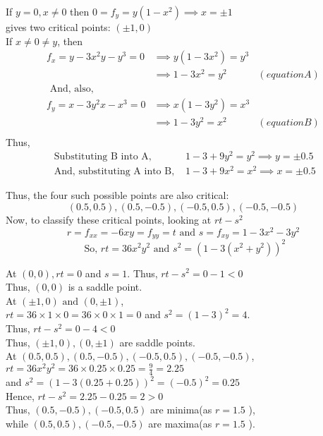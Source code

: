 \documentclass[20pt,a4paper]{extarticle} %
\theoremstyle{definition}
\theoremstyle{definition}
\begin{document}
If $y=0,x\neq0$ then $0=f_y=y(1-x^2) \implies x= \pm 1$ \\
gives two critical points: $(\pm 1,0)$\\

If $x\neq 0 \neq y$, then \\
\begin{align*}
	f_x=y-3x^2y-y^3=0 & \implies y(1-3x^2)=y^3 &\\
			  & \implies 1-3x^2=y^2 &(equation A)\\
	\text{ And, also, } & &\\
	f_y=x-3y^2x-x^3=0 & \implies x(1-3y^2)=x^3 &\\
			  & \implies 1-3y^2=x^2 &(equation B)\\
\end{align*}
Thus,
\begin{align*}
	\text{ Substituting B into A, } & 1-3+9y^2=y^2 \implies y = \pm 0.5 \\
	\text{ And, substituting A into B, } & 1-3+9x^2=x^2 \implies x = \pm 0.5
\end{align*}

Thus, the four such possible points are also critical:
\[(0.5,0.5),(0.5,-0.5),(-0.5,0.5),(-0.5,-0.5)\]
Now, to classify these critical points, looking at $rt-s^2$
\[ r=f_{xx}=-6xy=f_{yy}=t \text{ and } s=f_{xy}=1-3x^2-3y^2 \]
\[ \text{ So, } rt=36x^2y^2 \text{ and } s^2= (1-3(x^2+y^2))^2 \]

At $(0,0), rt=0$ and $s=1$. Thus, $rt-s^2=0-1<0 $\\
Thus, $(0,0)$ is a saddle point.\\

At $(\pm 1,0) \text{ and } (0, \pm 1)$,\\
$rt=36\times 1 \times 0=36 \times 0 \times 1=0$ and $s^2=(1-3)^2=4$.\\
Thus, $rt-s^2=0-4<0$\\
Thus, $(\pm 1,0) , (0, \pm 1)$ are saddle points.\\

At $(0.5,0.5),(0.5,-0.5),(-0.5,0.5),(-0.5,-0.5)$,\\
$rt=36x^2y^2=36 \times 0.25 \times 0.25=\frac{9}{4}=2.25$ \\ and $s^2=(1-3(0.25+0.25))^2=(-0.5)^2=0.25$\\
Hence, $rt-s^2=2.25-0.25=2>0$ \\
Thus, $(0.5,-0.5),(-0.5,0.5)$ are minima(as $r=1.5$ ),\\ while $(0.5,0.5),(-0.5,-0.5)$ are maxima(as $r=1.5$ ).
\pagebreak
\end{document}
